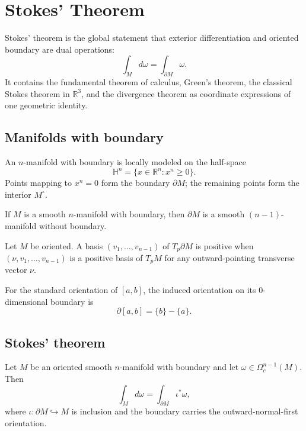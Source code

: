 \chapter{Stokes' Theorem}
\label{ch:vii11-stokes-theorem}

Stokes' theorem is the global statement that exterior differentiation and oriented boundary are dual operations:
\[
\boxed{\int_M d\omega=\int_{\partial M}\omega.}
\]
It contains the fundamental theorem of calculus, Green's theorem, the classical Stokes theorem in $\mathbb R^3$, and the divergence theorem as coordinate expressions of one geometric identity.

\section{Manifolds with boundary}
\begin{definition}\label{def:vii11-boundary-manifold}
An $n$-manifold with boundary is locally modeled on the half-space
\[
\mathbb H^n=\{x\in\mathbb R^n:x^n\ge0\}.
\]
Points mapping to $x^n=0$ form the boundary $\partial M$; the remaining points form the interior $M^\circ$.
\end{definition}

\begin{theorem}\label{thm:vii11-boundary-manifold}
If $M$ is a smooth $n$-manifold with boundary, then $\partial M$ is a smooth $(n-1)$-manifold without boundary.
\end{theorem}

\begin{definition}\label{def:vii11-boundary-orientation}
Let $M$ be oriented. A basis $(v_1,\ldots,v_{n-1})$ of $T_p\partial M$ is positive when $(\nu,v_1,\ldots,v_{n-1})$ is a positive basis of $T_pM$ for any outward-pointing transverse vector $\nu$.
\end{definition}

\begin{example}\label{ex:vii11-interval}
For the standard orientation of $[a,b]$, the induced orientation on its $0$-dimensional boundary is
\[
\partial[a,b]=\{b\}-\{a\}.
\]
\end{example}

\section{Stokes' theorem}
\begin{theorem}[Stokes]\label{thm:vii11-stokes}
Let $M$ be an oriented smooth $n$-manifold with boundary and let $\omega\in\Omega_c^{n-1}(M)$. Then
\[
\int_M d\omega=\int_{\partial M}\iota^*\omega,
\]
where $\iota:\partial M\hookrightarrow M$ is inclusion and the boundary carries the outward-normal-first orientation.
\end{theorem}


